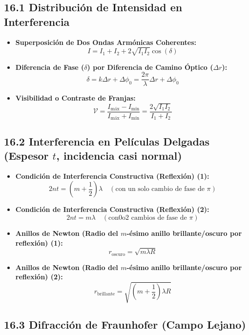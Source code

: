 \documentclass[11pt,a4paper]{article}
\begin{document}
\subsection*{16.1 Distribución de Intensidad en Interferencia}

\begin{itemize}
  \item \textbf{Superposición de Dos Ondas Armónicas Coherentes:}
  \[
    I = I_1 + I_2 + 2\sqrt{I_1 I_2} \cos(\delta)
  \]
  \item \textbf{Diferencia de Fase ($\delta$) por Diferencia de Camino Óptico ($\Delta r$):}
  \[
    \delta = k \Delta r + \Delta\phi_0 = \frac{2\pi}{\lambda} \Delta r + \Delta\phi_0
  \]
  \item \textbf{Visibilidad o Contraste de Franjas:}
  \[
    \mathcal{V} = \frac{I_{\mathrm{máx}} - I_{\mathrm{mín}}}{I_{\mathrm{máx}} + I_{\mathrm{mín}}} = \frac{2\sqrt{I_1 I_2}}{I_1 + I_2}
  \]
\end{itemize}

\subsection*{16.2 Interferencia en Películas Delgadas (Espesor $t$, incidencia casi normal)}

\begin{itemize}
  \item \textbf{Condición de Interferencia Constructiva (Reflexión) (1):}
  \[
    2 n t = \left( m + \frac{1}{2} \right)\lambda \quad (\text{con un solo cambio de fase de } \pi)
  \]
  \item \textbf{Condición de Interferencia Constructiva (Reflexión) (2):}
  \[
    2 n t = m \lambda \quad (\mathrm{con } 0 \mathrm{ o } 2 \text{ cambios de fase de } \pi)
  \]
  \item \textbf{Anillos de Newton (Radio del $m$-ésimo anillo brillante/oscuro por reflexión) (1):}
  \[
    r_{\text{oscuro}} = \sqrt{m \lambda R}
  \]
  \item \textbf{Anillos de Newton (Radio del $m$-ésimo anillo brillante/oscuro por reflexión) (2):}
  \[
    r_{\text{brillante}} = \sqrt{\left(m + \frac{1}{2}\right)\lambda R}
  \]
\end{itemize}

\subsection*{16.3 Difracción de Fraunhofer (Campo Lejano)}
\end{document}
